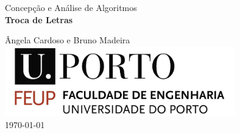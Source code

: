 

\begin{titlepage}
\begin{center}
 
\vspace*{3cm}

{\Large Concepção e Análise de Algoritmos}\\[2cm]

{\Huge \bfseries Troca de Letras \\[1cm]}

{\large Ângela Cardoso e Bruno Madeira}\\[2cm]

\includegraphics[width=10cm]{feup_logo.jpg}\\[2cm]


{\large \today}

\end{center}
\end{titlepage}